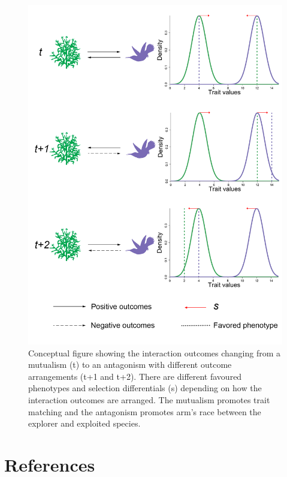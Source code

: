 \documentclass[a4paper, 12pt]{article}
\begin{document}
\begin{figure}
\linespread{1.0}

\includegraphics[width=\textwidth]{Fig1_ConDep.png}
\caption{Conceptual figure showing the interaction outcomes changing from a mutualism (t) to an antagonism with different outcome arrangements (t+1 and t+2). There are different favoured phenotypes and selection differentials (s) depending on how the interaction outcomes are arranged. The mutualism promotes trait matching and the antagonism promotes arm's race between the explorer and exploited species.}
\label{fig1}

\end{figure}

\nolinenumbers
\section{References}
\end{document}
